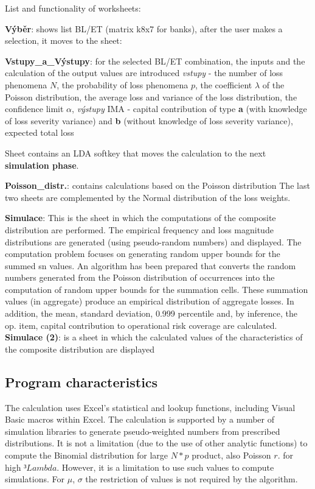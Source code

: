 \documentclass{article}
\begin{document}
List and functionality of worksheets:
\begin{compactitem}

\item \textbf{Výběr}: shows list BL/ET (matrix k8x7 for banks), after
  the user makes a selection, it moves to the sheet:
\item \textbf{Vstupy\_a\_Výstupy}: for the selected BL/ET combination, the inputs and the calculation of the output values are introduced
\emph{vstupy} - the number of loss phenomena $N$, the probability of loss phenomena $p$, the coefficient $\lambda$ of the Poisson distribution, the average loss and variance of the loss distribution, the confidence limit $\alpha$,
\emph{výstupy} IMA - capital contribution of type \textbf{a} (with knowledge of loss severity variance) and \textbf{b} (without knowledge of loss severity variance), expected total loss
  
Sheet contains an LDA softkey that moves the calculation to the next \textbf{simulation phase}.
\item \textbf{Poisson\_distr.}: contains calculations based on the Poisson distribution
The last two sheets are complemented by the Normal distribution of the loss weights.
\item \textbf{Simulace}: This is the sheet in which the computations of the composite distribution are performed. The empirical frequency and loss magnitude distributions are generated (using pseudo-random numbers) and displayed. The computation problem focuses on generating random upper bounds for the summed sn values. An algorithm has been prepared that converts the random numbers generated from the Poisson distribution of occurrences into the computation of random upper bounds for the summation cells. These summation values (in aggregate) produce an empirical distribution of aggregate losses. In addition, the mean, standard deviation, 0.999 percentile and, by inference, the op. item, capital contribution to operational risk coverage are calculated.
\textbf{Simulace (2)}: is a sheet in which the calculated values of the characteristics of the composite distribution are displayed

\end{compactitem}

\subsection{Program characteristics}

The calculation uses Excel's statistical and lookup functions, including Visual Basic macros within Excel. The calculation is supported by a number of simulation libraries to generate pseudo-weighted numbers from prescribed distributions. It is not a limitation (due to the use of other analytic functions) to compute the Binomial distribution for large $N * p$ product, also Poisson $r$. for high $³ Lambda$. However, it is a limitation to use such values to compute simulations. For $\mu$, $\sigma$ the restriction of values is not required by the algorithm.
\end{document}
